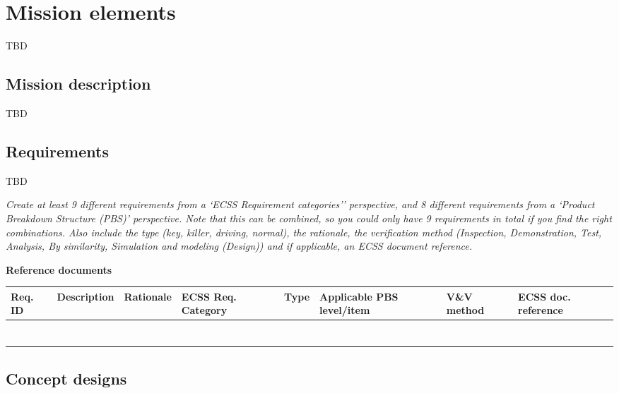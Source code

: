 \documentclass[../main.tex]{subfiles}
\begin{document}
\section{Mission elements}\label{mission-elements}
TBD

\subsection{Mission description}\label{mission-description}

TBD

\subsection{Requirements}\label{requirements}

TBD


\emph{Create at least 9 different requirements from a `ECSS Requirement
categories'' perspective, and 8 different requirements from a `Product
Breakdown Structure (PBS)' perspective. Note that this can be combined,
so you could only have 9 requirements in total if you find the right
combinations. Also include the type (key, killer, driving, normal), the
rationale, the verification method (Inspection, Demonstration, Test,
Analysis, By similarity, Simulation and modeling (Design)) and if
applicable, an ECSS document reference.}

\textbf{Reference documents}
\begin{table}[htp]
\centering
\begin{tabularx}{\textwidth}{|p{0.6cm}|X|p{1.5cm}|p{2cm}|p{1cm}|p{2cm}|p{1.2cm}|p{1.4cm}|}
\hline
Req. ID & Description & Rationale & ECSS Req. Category & Type & Applicable PBS level/item & V\&V method & ECSS doc. reference \\
\hline
& & & & & & & \\
\hline
& & & & & & & \\
\hline
& & & & & & & \\
\hline
& & & & & & & \\
\hline
& & & & & & & \\
\hline
& & & & & & & \\
\hline
& & & & & & & \\
\hline
\end{tabularx}
\end{table}

\subsection{Concept designs}\label{concept-designs}
\end{document}
